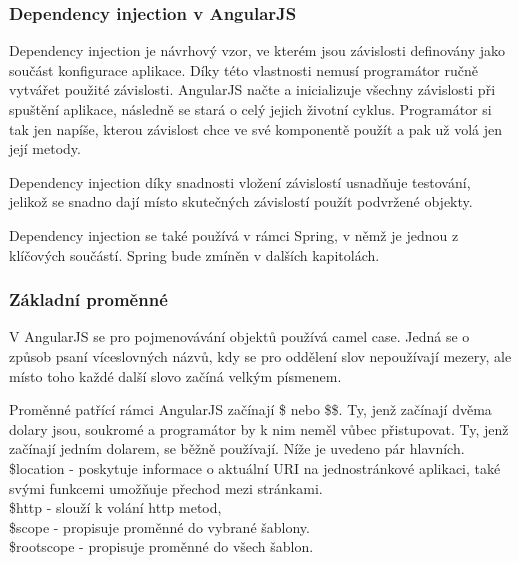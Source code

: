 \documentclass[czech,master,public,dept460,male,cpdeclaration,twoside]{diploma}
\begin{document}
\subsubsection{Dependency injection v AngularJS}
Dependency injection je návrhový vzor, ve kterém jsou závislosti definovány jako součást konfigurace aplikace. Díky této vlastnosti nemusí programátor ručně vytvářet použité závislosti. AngularJS načte a inicializuje všechny závislosti při spuštění aplikace, následně se stará o celý jejich životní cyklus. Programátor si tak jen napíše, kterou závislost chce ve své komponentě použít a pak už volá jen její metody.

Dependency injection díky snadnosti vložení závislostí usnadňuje testování, jelikož se snadno dají místo skutečných závislostí použít podvržené objekty.

Dependency injection se také používá v rámci Spring, v němž je jednou z klíčových součástí. Spring bude zmíněn v dalších kapitolách. \cite{LearningAngularjs}

\subsubsection{Základní proměnné}
V AngularJS se pro pojmenovávání objektů používá camel case. Jedná se o způsob psaní víceslovných názvů, kdy se pro oddělení slov nepoužívají mezery, ale místo toho každé další slovo začíná velkým písmenem.

Proměnné patřící rámci AngularJS začínají \$ nebo \$\$. Ty, jenž začínají dvěma dolary jsou, soukromé a programátor by k nim neměl vůbec přistupovat. Ty, jenž začínají jedním dolarem, se běžně používají. Níže je uvedeno pár hlavních.\\
\$location - poskytuje informace o aktuální URI na jednostránkové aplikaci, také svými funkcemi umožňuje přechod mezi stránkami.\\
\$http - slouží k volání http metod,\\
\$scope - propisuje proměnné do vybrané šablony.\\
\$rootscope - propisuje proměnné do všech šablon.
\end{document}
